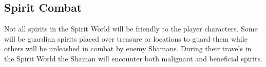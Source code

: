 




\subsection{Spirit Combat}
\label{ssec:spirit-combat}
Not all spirits in the Spirit World will be friendly to the player characters. Some will be guardian spirits placed over treasure or locations to guard them while others will be unleashed in combat by enemy Shamans. During their travels in the Spirit World the Shaman will encounter both malignant and beneficial spirits.

